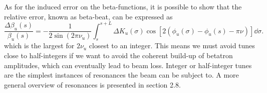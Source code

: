     As for the induced error on the beta-functions, it is possible to show that the relative error, known as beta-beat, can be expressed as
     \begin{equation}
        \frac{\Delta \beta_u(s)}{\beta_u(s)} = - \frac{1}{2\sin(2\pi\nu_u)}\int_{s}^{s+L}\Delta K_u(\sigma)\cos[2(\phi_u(\sigma)-\phi_u(s)-\pi\nu)]\dd\sigma.
        \label{eq:beta_beat}
     \end{equation}
which is the largest for $2\nu_u$ closest to an integer. This means we must avoid tunes close to half-integers if we want to avoid the coherent build-up of betatron amplitudes, which can eventually lead to beam loss.
Integer or half-integer tunes are the simplest instances of resonances the beam can be subject to. A more general overview of resonances is presented in section 2.8.
